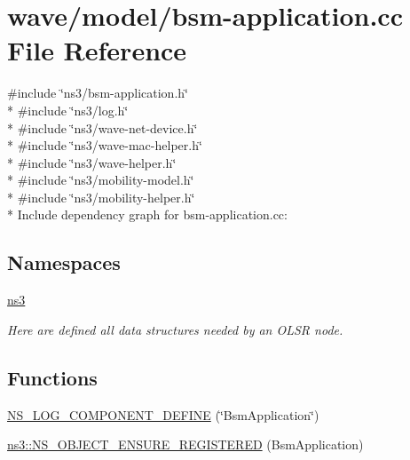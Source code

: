 \hypertarget{bsm-application_8cc}{}\section{wave/model/bsm-\/application.cc File Reference}
\label{bsm-application_8cc}
{\ttfamily \#include \char`\"{}ns3/bsm-\/application.\+h\char`\"{}}\\*
{\ttfamily \#include \char`\"{}ns3/log.\+h\char`\"{}}\\*
{\ttfamily \#include \char`\"{}ns3/wave-\/net-\/device.\+h\char`\"{}}\\*
{\ttfamily \#include \char`\"{}ns3/wave-\/mac-\/helper.\+h\char`\"{}}\\*
{\ttfamily \#include \char`\"{}ns3/wave-\/helper.\+h\char`\"{}}\\*
{\ttfamily \#include \char`\"{}ns3/mobility-\/model.\+h\char`\"{}}\\*
{\ttfamily \#include \char`\"{}ns3/mobility-\/helper.\+h\char`\"{}}\\*
Include dependency graph for bsm-\/application.cc\+:
\subsection*{Namespaces}
\begin{DoxyCompactItemize}
\item 
 \hyperlink{namespacens3}{ns3}
\begin{DoxyCompactList}\small\item\em Here are defined all data structures needed by an O\+L\+SR node. \end{DoxyCompactList}\end{DoxyCompactItemize}
\subsection*{Functions}
\begin{DoxyCompactItemize}
\item 
\hyperlink{bsm-application_8cc_ac1eceb8ca7d09a261be405bee90b14f3}{N\+S\+\_\+\+L\+O\+G\+\_\+\+C\+O\+M\+P\+O\+N\+E\+N\+T\+\_\+\+D\+E\+F\+I\+NE} (\char`\"{}Bsm\+Application\char`\"{})
\item 
\hyperlink{namespacens3_a5bd02ec4e3c3d24f2299347741f3c4cc}{ns3\+::\+N\+S\+\_\+\+O\+B\+J\+E\+C\+T\+\_\+\+E\+N\+S\+U\+R\+E\+\_\+\+R\+E\+G\+I\+S\+T\+E\+R\+ED} (Bsm\+Application)
\end{DoxyCompactItemize}


